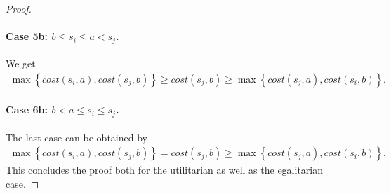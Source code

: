 \documentclass[a4paper,UKenglish,cleveref, autoref, thm-restate]{lipics-v2021}
\newcommand{\cost}{\mathit{cost}}
\begin{document}
\begin{proof}
\paragraph*{Case 5b: $b \leq s_i \leq a < s_j$.}
We get
\begin{align*}
    \max \left\{\cost(s_i,a), \cost(s_j,b)\right\} \geq \cost(s_j,b) \geq \max \left\{\cost(s_j,a),\cost(s_i,b)\right\}.
\end{align*}
\paragraph*{Case 6b: $b < a \leq s_i \leq s_j$.}
The last case can be obtained by
\begin{align*}
      \max \left\{\cost(s_i,a), \cost(s_j,b)\right\} = \cost(s_j,b) \geq \max \left\{\cost(s_j,a),\cost(s_i,b)\right\}.  
\end{align*}
This concludes the proof both for the utilitarian as well as the egalitarian case.
\end{proof}

\lemmacompact*
\end{document}
